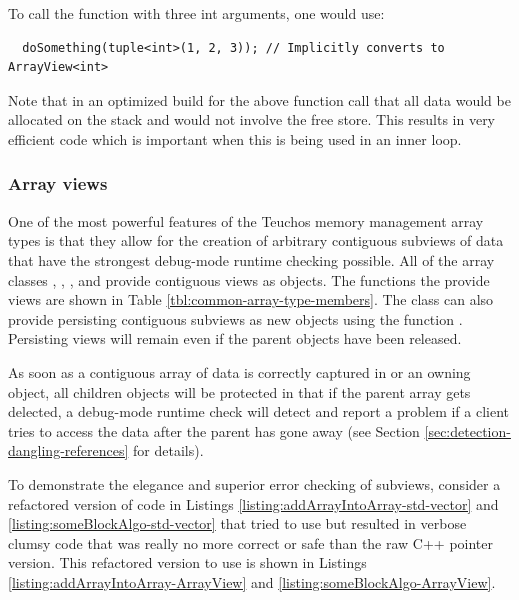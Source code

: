\documentclass[pdf,ps2pdf,11pt]{SANDreport}
\begin{document}
To call the function with three int arguments, one would use:

{\small\begin{verbatim}
  doSomething(tuple<int>(1, 2, 3)); // Implicitly converts to ArrayView<int>
\end{verbatim}}

Note that in an optimized build for the above function call that all
data would be allocated on the stack and would not involve the free
store.  This results in very efficient code which is important when
this is being used in an inner loop.


%
{}\subsubsection{Array views}
\label{sec:array-views}
%

One of the most powerful features of the Teuchos memory management
array types is that they allow for the creation of arbitrary
contiguous subviews of data that have the strongest debug-mode runtime
checking possible.  All of the array classes {},
{}, {}, and {} provide contiguous
views as {} objects.  The functions the provide
{} views are shown in Table
{}\ref{tbl:common-array-type-members}.  The {} class can
also provide persisting contiguous subviews as new {}
objects using the function {}.
Persisting views will remain even if the parent {}
objects have been released.

As soon as a contiguous array of data is correctly captured in
{} or an owning {} object, all children
{} objects will be protected in that if the parent
array gets delected, a debug-mode runtime check will detect and report
a problem if a client tries to access the data after the parent has
gone away (see Section {}\ref{sec:detection-dangling-references} for
details).

To demonstrate the elegance and superior error checking of
{} subviews, consider a refactored version of code in
Listings {}\ref{listing:addArrayIntoArray-std-vector} and
{}\ref{listing:someBlockAlgo-std-vector} that tried to use
{} but resulted in verbose clumsy code that was
really no more correct or safe than the raw C++ pointer version.  This
refactored version to use {} is shown in Listings
{}\ref{listing:addArrayIntoArray-ArrayView} and
{}\ref{listing:someBlockAlgo-ArrayView}.
\end{document}

